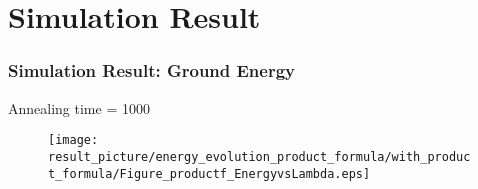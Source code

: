\documentclass{beamer}
\begin{document}
\section{Simulation Result}
%			
%
%
%		
%

%		
%

\begin{frame}
	\frametitle{Simulation Result: Ground Energy}
	Annealing time = 1000
	\begin{figure}
		\centering
		\texttt{[image: result\_picture/energy\_evolution\_product\_formula/with\_product\_formula/Figure\_productf\_EnergyvsLambda.eps]}
	\end{figure}
\end{frame}
\end{document}
